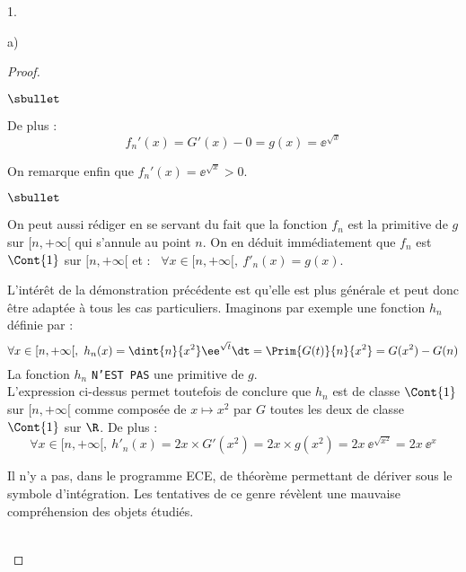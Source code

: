 \documentclass[11pt]{article}%
\begin{document}
\begin{noliste}{1.}
\begin{noliste}{a)}
\begin{proof}
\begin{noliste}{$\sbullet$}
      \item De plus :
        \[
        f_n'(x) = G'(x)-0 = g(x) = \ee^{\sqrt{x}}
        \]
        \conc{$\forall x \in [n,+\infty[$, $f_n'(x)= \ee^{\sqrt{x}}$}

      \item On remarque enfin que $f_n'(x) = \ee^{\sqrt{x}} > 0$.%
        \conc{La fonction $f_n$ est strictement croissante sur $[n,
          +\infty[$.}%
      \end{noliste}
      \begin{remarkL}{.98}%
        \begin{noliste}{$\sbullet$}
        \item On peut aussi rédiger en se servant du fait que la
          fonction $f_n$ est la primitive de $g$ sur $[n, +\infty[$
          qui s'annule au point $n$. On en déduit immédiatement que
          $f_n$ est $\Cont{1}$ sur $[n, +\infty[$ et : \ $\forall x
          \in [n, +\infty[, \ f'_n(x) = g(x)$.

        \item L'intérêt de la démonstration précédente est qu'elle est
          plus générale et peut donc être adaptée à tous les cas
          particuliers. Imaginons par exemple une fonction $h_n$
          définie par :\\[-.4cm]
          \[
          \forall x \in [n, +\infty[, \ h_n(x) = \dint{n}{x^2}
          \ee^{\sqrt{t}} \dt = \Prim{G(t)}{n}{x^2} = G(x^2)- G(n)
          \]
          La fonction $h_n$ {\tt N'EST PAS} une primitive de $g$.\\
          L'expression ci-dessus permet toutefois de conclure que
          $h_n$ est de classe $\Cont{1}$ sur $[n, +\infty[$ comme
          composée de $x \mapsto x^2$ par $G$ toutes les deux de
          classe $\Cont{1}$ sur $\R$. De plus :
          \[
          \forall x \in [n, +\infty[, \ h'_n(x) = 2x \times G'(x^2) =
          2x \times g(x^2) = 2x \ \ee^{\sqrt{x^2}} = 2x \
          \ee^{x}
          \]
        \item Il n'y a pas, dans le programme ECE, de théorème
          permettant de dériver sous le symbole d'intégration. Les
          tentatives de ce genre révèlent une mauvaise compréhension
          des objets étudiés.
        \end{noliste}
      \end{remarkL}~\\[-1.4cm]
    \end{proof}



\end{noliste}
\end{noliste}
\end{document}
